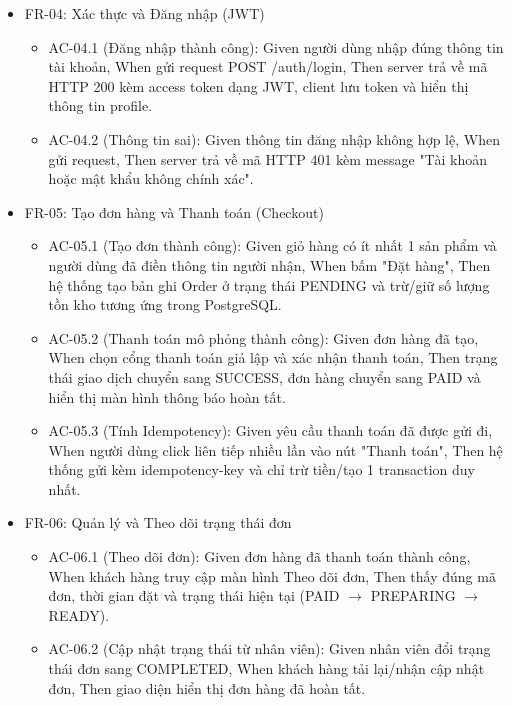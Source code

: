 \documentclass[english,12pt,a4paper]{book}
\begin{document}
\begin{itemize}[]
\begin{itemize}[]
			\item AC-03.2 (Cập nhật số lượng/Xóa): Given giỏ hàng có 1 món, When người dùng giảm số lượng về 0 hoặc bấm nút xóa, Then hệ thống hiển thị hộp thoại xác nhận; nếu đồng ý, món đó bị xóa khỏi giỏ và tổng tiền giỏ hàng tính lại chính xác.
		\end{itemize}
		\item FR-04: Xác thực và Đăng nhập (JWT)
		\begin{itemize}[]
			\item AC-04.1 (Đăng nhập thành công): Given người dùng nhập đúng thông tin tài khoản, When gửi request POST /auth/login, Then server trả về mã HTTP 200 kèm access token dạng JWT, client lưu token và hiển thị thông tin profile.
			\item AC-04.2 (Thông tin sai): Given thông tin đăng nhập không hợp lệ, When gửi request, Then server trả về mã HTTP 401 kèm message "Tài khoản hoặc mật khẩu không chính xác".
		\end{itemize}
		\item FR-05: Tạo đơn hàng và Thanh toán (Checkout)
		\begin{itemize}[]
			\item AC-05.1 (Tạo đơn thành công): Given giỏ hàng có ít nhất 1 sản phẩm và người dùng đã điền thông tin người nhận, When bấm "Đặt hàng", Then hệ thống tạo bản ghi Order ở trạng thái PENDING và trừ/giữ số lượng tồn kho tương ứng trong PostgreSQL.
			\item AC-05.2 (Thanh toán mô phỏng thành công): Given đơn hàng đã tạo, When chọn cổng thanh toán giả lập và xác nhận thanh toán, Then trạng thái giao dịch chuyển sang SUCCESS, đơn hàng chuyển sang PAID và hiển thị màn hình thông báo hoàn tất.
			\item AC-05.3 (Tính Idempotency): Given yêu cầu thanh toán đã được gửi đi, When người dùng click liên tiếp nhiều lần vào nút "Thanh toán", Then hệ thống gửi kèm idempotency-key và chỉ trừ tiền/tạo 1 transaction duy nhất.
		\end{itemize}
		\item  FR-06: Quản lý và Theo dõi trạng thái đơn
		\begin{itemize}[]
			\item AC-06.1 (Theo dõi đơn): Given đơn hàng đã thanh toán thành công, When khách hàng truy cập màn hình Theo dõi đơn, Then thấy đúng mã đơn, thời gian đặt và trạng thái hiện tại (PAID $\rightarrow$ PREPARING $\rightarrow$ READY).  
			\item AC-06.2 (Cập nhật trạng thái từ nhân viên): Given nhân viên đổi trạng thái đơn sang COMPLETED, When khách hàng tải lại/nhận cập nhật đơn, Then giao diện hiển thị đơn hàng đã hoàn tất.
		\end{itemize}
	\end{itemize}
\end{document}
